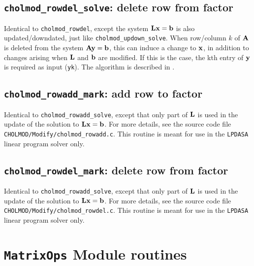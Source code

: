 \documentclass[11pt]{article}
\newcommand{\m}[1]{{\bf{#1}}}       %
\begin{document}
\subsection{{\tt cholmod\_rowdel\_solve}: delete row from factor}


Identical to {\tt cholmod\_rowdel}, except the system $\m{Lx}=\m{b}$ is also updated/downdated, just like {\tt cholmod\_updown\_solve}.
When row/column $k$ of $\m{A}$ is deleted from the system $\m{Ay}=\m{b}$, this can induce
a change to $\m{x}$, in addition to changes arising when $\m{L}$ and $\m{b}$ are modified.
If this is the case, the kth entry of $\m{y}$ is required as input ({\tt yk}).
The algorithm is described in \cite{DavisHager05}.

\subsection{{\tt cholmod\_rowadd\_mark}: add row to factor}


Identical to {\tt cholmod\_rowadd\_solve}, except that only part of $\m{L}$
is used in the update of the solution to $\m{Lx}=\m{b}$.  For more details,
see the source code file {\tt CHOLMOD/Modify/cholmod\_rowadd.c}.
This routine is meant for use in the {\tt LPDASA} linear program solver only.

\subsection{{\tt cholmod\_rowdel\_mark}: delete row from factor}


Identical to {\tt cholmod\_rowadd\_solve}, except that only part of $\m{L}$
is used in the update of the solution to $\m{Lx}=\m{b}$.  For more details,
see the source code file {\tt CHOLMOD/Modify/cholmod\_rowdel.c}.
This routine is meant for use in the {\tt LPDASA} linear program solver only.

\newpage \section{{\tt MatrixOps} Module routines}
\end{document}
